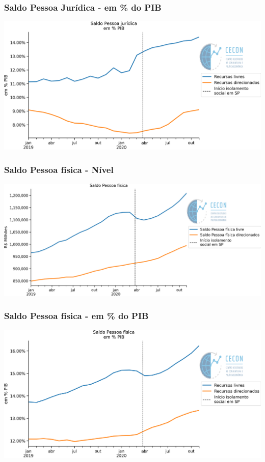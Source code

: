 \documentclass{SelfArx}
\begin{document}
\subsubsection*{Saldo Pessoa Jurídica - em \% do PIB}
\label{sec:orgb3cc528}
\begin{center}
\includegraphics[width=.9\linewidth]{./figs/Credito/SaldoPJ_PIB.png}
\end{center}

\subsubsection*{Saldo Pessoa física - Nível}
\label{sec:org48cdb4a}

\begin{center}
\includegraphics[width=.9\linewidth]{./figs/Credito/SaldoPF.png}
\end{center}


\subsubsection*{Saldo Pessoa física - em \% do PIB}
\label{sec:orgc1cab59}

\begin{center}
\includegraphics[width=.9\linewidth]{./figs/Credito/SaldoPF_PIB.png}
\end{center}
\end{document}
